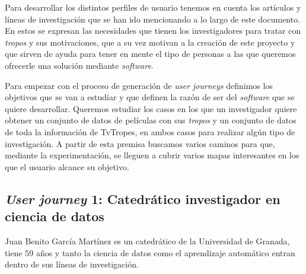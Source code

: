 Para desarrollar los distintos perfiles de usuario tenemos en cuenta los
artículos y líneas de investigación que se han ido mencionando a lo largo de
este documento. En estos se expresan las necesidades que tienen los
investigadores para tratar con \textit{tropos} y sus motivaciones, que a su vez
motivan a la creación de este proyecto y que sirven de ayuda para tener en mente
el tipo de personas a las que queremos ofrecerle una solución mediante
\textit{software}.

Para empezar con el proceso de generación de \textit{user journeys} definimos
los objetivos que se van a estudiar y que definen la razón de ser del
\textit{software} que se quiere desarrollar. Queremos estudiar los casos en los
que un investigador quiere obtener un conjunto de datos de películas con sus
\textit{tropos} y un conjunto de datos de toda la información de TvTropes, en
ambos casos para realizar algún tipo de investigación. A partir de esta premisa
buscamos varios caminos para que, mediante la experimentación, se lleguen a
cubrir varios mapas interesantes en los que el usuario alcance su objetivo.

\subsection{\textit{User journey} 1: Catedrático investigador en ciencia de
datos} 

Juan Benito García Martínez es un catedrático de la Universidad de Granada,
tiene 59 años y tanto la ciencia de datos como el aprendizaje automático entran
dentro de sus líneas de investigación.

